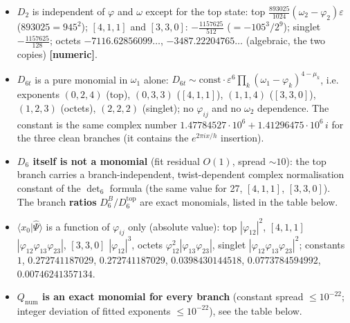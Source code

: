 \documentclass[10pt]{article}
\begin{document}
\begin{itemize}\setlength{\itemsep}{1pt}
\item $D_2$ is independent of $\varphi$ and $\omega$ except for the top state: top $\frac{893025}{1024}(\omega_2-\varphi_2)\varepsilon$ ($893025=945^2$); $[4,1,1]$ and $[3,3,0]$: $-\frac{1157625}{512}$ ($=-105^3/2^9$); singlet $-\frac{1157625}{128}$; octets $-7116.62856099\ldots$, $-3487.22204765\ldots$ (algebraic, the two copies) \textbf{[numeric]}.
\item $D_{6t}$ is a pure monomial in $\omega_1$ alone: $D_{6t}\sim\mathrm{const}\cdot\varepsilon^6\prod_k(\omega_1-\varphi_k)^{4-\mu_k}$, i.e. exponents $(0,2,4)$ (top), $(0,3,3)$ ($[4,1,1]$), $(1,1,4)$ ($[3,3,0]$), $(1,2,3)$ (octets), $(2,2,2)$ (singlet); no $\varphi_{ij}$ and no $\omega_2$ dependence. The constant is the same complex number $1.47784527\cdot10^6+1.41296475\cdot10^6\,i$ for the three clean branches (it contains the $e^{2\pi ix/h}$ insertion).
\item \textbf{$D_6$ itself is not a monomial} (fit residual $O(1)$, spread $\sim10$): the top branch carries a branch-independent, twist-dependent complex normalisation constant of the $\det_6$ formula (the same value for 27, $[4,1,1]$, $[3,3,0]$). The branch \textbf{ratios} $D_6^B/D_6^{\mathrm{top}}$ are exact monomials, listed in the table below.
\item $\langle x_0|\hat\Psi\rangle$ is a function of $\varphi_{ij}$ only (absolute value): top $|\varphi_{12}|^2$, $[4,1,1]$ $|\varphi_{12}\varphi_{13}\varphi_{23}|$, $[3,3,0]$ $|\varphi_{12}|^3$, octets $\varphi_{12}^2|\varphi_{13}\varphi_{23}|$, singlet $|\varphi_{12}\varphi_{13}\varphi_{23}|^2$; constants $1$, $0.272741187029$, $0.272741187029$, $0.0398430144518$, $0.0773784594992$, $0.00746241357134$.
\item \textbf{$Q_{\mathrm{num}}$ is an exact monomial for every branch} (constant spread $\le10^{-22}$; integer deviation of fitted exponents $\le10^{-22}$), see the table below.
\end{itemize}
\end{document}
